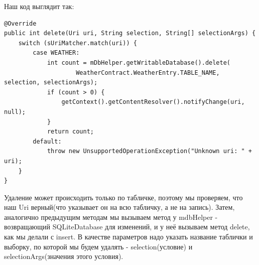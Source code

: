 \documentclass[12 pt]{article}
\begin{document}
\begin{itemize}
	    Наш код выглядит так:
	    \begin{lstlisting}
@Override
public int delete(Uri uri, String selection, String[] selectionArgs) {
    switch (sUriMatcher.match(uri)) {
        case WEATHER:
            int count = mDbHelper.getWritableDatabase().delete(
                    WeatherContract.WeatherEntry.TABLE_NAME, selection, selectionArgs);
            if (count > 0) {
                getContext().getContentResolver().notifyChange(uri, null);
            }
            return count;
        default:
            throw new UnsupportedOperationException("Unknown uri: " + uri);
    }
}	    
	    \end{lstlisting}
	    Удаление может происходить только по табличке, поэтому мы проверяем, что наш Uri верный(что указывает он на всю табличку, а не на запись). Затем, аналогично предыдущим методам мы вызываем метод у mdbHelper - возвращающий SQLiteDatabase для изменений, и у неё вызываем метод delete, как мы делали с insert. В качестве параметров надо указать название таблички и выборку, по которой мы будем удалять - selection(условие) и selectionArgs(значения этого условия).
	    

\end{itemize}
\end{document}
